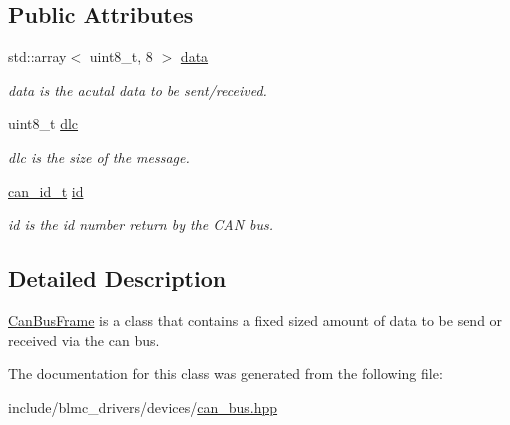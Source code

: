 \subsection*{Public Attributes}
\begin{DoxyCompactItemize}
\item 
std\+::array$<$ uint8\+\_\+t, 8 $>$ \hyperlink{classblmc__drivers_1_1CanBusFrame_a1a4cd54d31de4361b003e39dfdfa4cfe}{data}\hypertarget{classblmc__drivers_1_1CanBusFrame_a1a4cd54d31de4361b003e39dfdfa4cfe}{}\label{classblmc__drivers_1_1CanBusFrame_a1a4cd54d31de4361b003e39dfdfa4cfe}

\begin{DoxyCompactList}\small\item\em data is the acutal data to be sent/received. \end{DoxyCompactList}\item 
uint8\+\_\+t \hyperlink{classblmc__drivers_1_1CanBusFrame_ab5c88f0e6fa037ace23a059a3e75b30b}{dlc}\hypertarget{classblmc__drivers_1_1CanBusFrame_ab5c88f0e6fa037ace23a059a3e75b30b}{}\label{classblmc__drivers_1_1CanBusFrame_ab5c88f0e6fa037ace23a059a3e75b30b}

\begin{DoxyCompactList}\small\item\em dlc is the size of the message. \end{DoxyCompactList}\item 
\hyperlink{os__interface_8hpp_ab9491ad99890aa9ecf1785d1edd23d64}{can\+\_\+id\+\_\+t} \hyperlink{classblmc__drivers_1_1CanBusFrame_a5d204dce9fded6502c7d51f3aabbad61}{id}\hypertarget{classblmc__drivers_1_1CanBusFrame_a5d204dce9fded6502c7d51f3aabbad61}{}\label{classblmc__drivers_1_1CanBusFrame_a5d204dce9fded6502c7d51f3aabbad61}

\begin{DoxyCompactList}\small\item\em id is the id number return by the C\+AN bus. \end{DoxyCompactList}\end{DoxyCompactItemize}


\subsection{Detailed Description}
\hyperlink{classblmc__drivers_1_1CanBusFrame}{Can\+Bus\+Frame} is a class that contains a fixed sized amount of data to be send or received via the can bus. 

The documentation for this class was generated from the following file\+:\begin{DoxyCompactItemize}
\item 
include/blmc\+\_\+drivers/devices/\hyperlink{can__bus_8hpp}{can\+\_\+bus.\+hpp}\end{DoxyCompactItemize}
